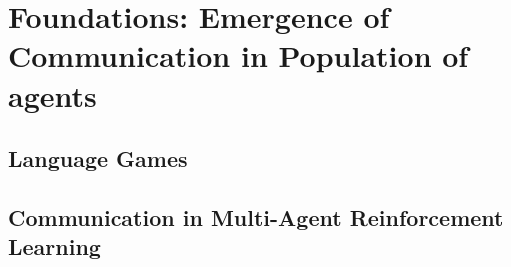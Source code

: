\chapter{Foundations: Emergence of Communication in Population of agents}


\section{Language Games}

\section{Communication in Multi-Agent Reinforcement Learning}